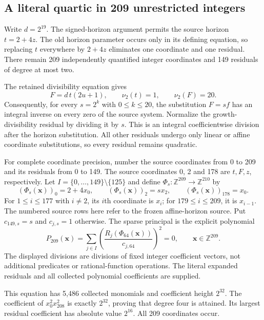 \subsection{A literal quartic in 209 unrestricted integers}

Write $d=2^{19}$.  The signed-horizon argument permits the source horizon
$t=2+4z$.  The old horizon parameter occurs only in its defining equation,
so replacing $t$ everywhere by $2+4z$ eliminates one coordinate and one
residual.  There remain 209 independently quantified integer coordinates and
149 residuals of degree at most two.

The retained divisibility equation gives
\[
 F=d\,t(2u+1),\qquad \nu_2(t)=1,\qquad \nu_2(F)=20.
\]
Consequently, for every $s=2^k$ with $0\leq k\leq20$, the substitution
$F=sf$ has an integral inverse on every zero of the source system.  Normalize
the growth-divisibility residual by dividing it by $s$.  This is an integral
coefficientwise division after the horizon substitution.  All other
residuals undergo only linear or affine coordinate substitutions, so every
residual remains quadratic.

For complete coordinate precision, number the source coordinates from 0 to
209 and its residuals from 0 to 149.  The source coordinates 0, 2 and 178 are
$t,F,z$, respectively.  Let $I=\{0,\ldots,149\}\setminus\{125\}$ and
define $\Phi_s:\mathbb Z^{209}\longrightarrow\mathbb Z^{210}$ by
\[
 (\Phi_s(\boldsymbol x))_0=2+4x_0,\qquad
 (\Phi_s(\boldsymbol x))_2=sx_2,\qquad
 (\Phi_s(\boldsymbol x))_{178}=x_0.
\]
For $1\leq i\leq177$ with $i\ne2$, its $i$th coordinate is $x_i$; for
$179\leq i\leq209$, it is $x_{i-1}$.  The numbered source rows here refer
to the frozen affine-horizon source.  Put $c_{149,s}=s$ and $c_{j,s}=1$
otherwise.  The sparse principal is the explicit polynomial
\[
 \boxed{\displaystyle
 P_{209}(\boldsymbol x)=
 \sum_{j\in I}\left(\frac{R_j(\Phi_{64}(\boldsymbol x))}
 {c_{j,64}}\right)^2=0,
 \qquad\boldsymbol x\in\mathbb Z^{209}.}
\]
The displayed divisions are divisions of fixed integer coefficient vectors,
not additional predicates or rational-function operations.  The literal
expanded residuals and all collected polynomial coefficients are supplied.

This equation has 5,486 collected monomials and coefficient height $2^{32}$.
The coefficient of $x_0^2x_{208}^2$ is exactly $2^{32}$, proving that degree
four is attained.  Its largest residual coefficient has absolute value
$2^{16}$.  All 209 coordinates occur.

